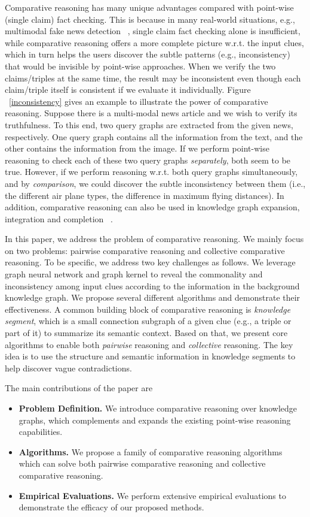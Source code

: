 Comparative reasoning has many unique advantages compared with point-wise (single claim) fact checking.
This is because in many real-world situations, e.g., multimodal fake news detection ~\cite{multimodal}, single claim fact checking alone is insufficient, while
comparative reasoning
offers a more complete picture w.r.t. the input clues,
which in turn helps the users discover the subtle patterns (e.g., inconsistency) that would be invisible by point-wise approaches. When we verify the two claims/triples at the same time, the result may be inconsistent even though each claim/triple itself is consistent if we evaluate it individually.
Figure ~\ref{inconsistency} gives an example to illustrate the power of comparative reasoning.
Suppose there is a multi-modal news article and we wish to verify its truthfulness. To this end, two query graphs are extracted from the given news, respectively. One query graph contains all the information from the text, and the other contains the information from the image. If we perform point-wise reasoning to check each of these two query graphs {\em separately}, both seem to be true. However, if we perform reasoning w.r.t. both query graphs simultaneously, and by {\em comparison}, we could discover the subtle inconsistency between them (i.e., the different air plane types, the difference in maximum flying distances). In addition, comparative reasoning can also be used in knowledge graph expansion, integration and completion ~\cite{kompare}.


In this paper, we address the problem of comparative reasoning.
We mainly focus on two problems: pairwise comparative reasoning and collective comparative reasoning. To be specific, we address two key challenges as follows.
We leverage graph neural network and graph kernel to reveal the commonality and inconsistency among input clues according to the information in the background knowledge graph.
We propose several different algorithms and demonstrate their effectiveness. A common building block of comparative reasoning is {\em knowledge segment}, which is a small connection subgraph of a given clue (e.g., a triple or part of it) to summarize its semantic context.
Based on that, we present core algorithms to enable both {\em pairwise} reasoning and {\em collective} reasoning.
The key idea is to use the structure and semantic information in knowledge segments to help discover vague contradictions.

The main contributions of the paper are
\begin{itemize} %
    \item {\bf Problem Definition.} We introduce comparative reasoning over knowledge graphs, which complements and expands
    the existing point-wise reasoning capabilities.
    \item {\bf Algorithms.} We propose a family of comparative reasoning algorithms which can solve both pairwise comparative reasoning and collective comparative reasoning.
    \item {\bf Empirical Evaluations.} We perform extensive empirical evaluations to demonstrate the efficacy of our proposed methods.
\end{itemize}


